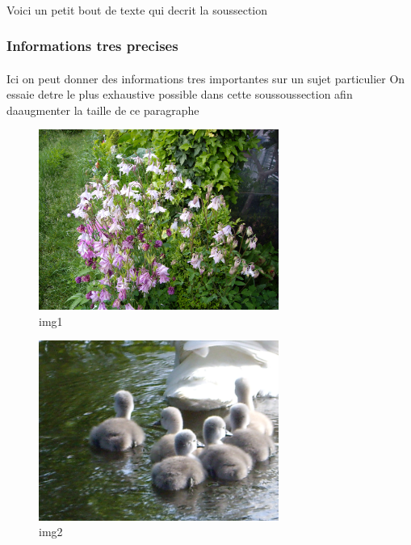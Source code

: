 \documentclass[a4paper,10pt,openany,oneside]{report}
\begin{document}
\paragraph{}
Voici un petit bout de texte qui decrit la soussection

\subsubsection{Informations tres precises}
\paragraph{}
Ici on peut donner des informations tres importantes sur un sujet particulier On essaie detre le plus exhaustive possible dans cette soussoussection afin daaugmenter la taille de ce paragraphe

\begin{figure}[ht]
	\centering
	\vspace*{1cm}
	\includegraphics[width=0.7\textwidth]{img/img1.jpg}
	\caption{\label{}img1}
\end{figure}

\begin{figure}[ht]
	\centering
	\vspace*{1cm}
	\includegraphics[width=0.7\textwidth]{img/img2.jpg}
	\caption{\label{}img2}
\end{figure}
\end{document}
